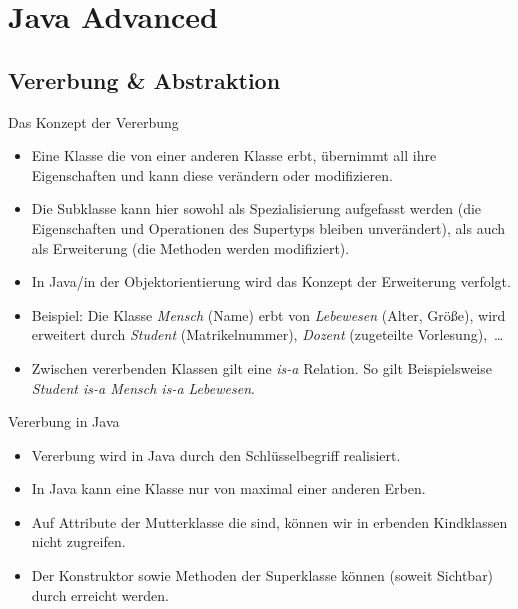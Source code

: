 
\section{Java Advanced}

\subsection{Vererbung \& Abstraktion}

\begin{frame}{Das Konzept der Vererbung}
    \hypertarget<1>{mrk:Vererbung}{}%
    \begin{itemize}[<+(1)->]
        \item Eine Klasse die von einer anderen Klasse erbt, übernimmt all ihre Eigenschaften und kann diese verändern oder modifizieren.
        \item Die Subklasse kann hier sowohl als Spezialisierung aufgefasst werden (die Eigenschaften und Operationen des Supertyps bleiben unverändert),\pause{} als auch als Erweiterung (die Methoden werden modifiziert).
        \item In Java/in der Objektorientierung wird das Konzept der Erweiterung verfolgt.
        \item Beispiel: Die Klasse \emph{Mensch} (Name) erbt von \emph{Lebewesen} (Alter, Größe),\pause{} wird erweitert durch \emph{Student} (Matrikelnummer), \emph{Dozent} (zugeteilte Vorlesung),~\ldots
        \item Zwischen vererbenden Klassen gilt eine \emph{is-a} Relation.\pause{} So gilt Beispielsweise \emph{Student is-a Mensch is-a Lebewesen}.
    \end{itemize}
\end{frame}

\begin{frame}{Vererbung in Java}
    \begin{itemize}[<+(1)->]
        \widei
        \item Vererbung wird in Java durch den Schlüsselbegriff  realisiert.
        \item In Java kann eine Klasse nur von maximal einer anderen Erben.
        \item Auf Attribute der Mutterklasse die  sind,\pause{} können wir in erbenden Kindklassen nicht zugreifen.
        \item Der Konstruktor sowie Methoden der Superklasse können (soweit Sichtbar) durch  erreicht werden.
    \end{itemize}
\end{frame}


